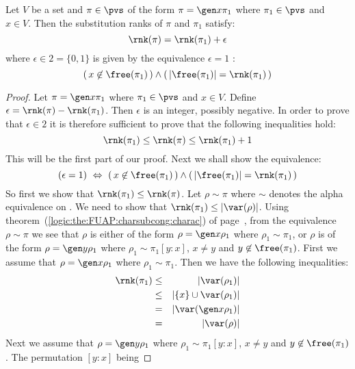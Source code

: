 \begin{prop}\label{logic:prop:FUAP:substrank:recursion:gen}
Let $V$ be a set and $\pi\in\pvs$ of the form $\pi=\gen x\pi_{1}$
where $\pi_{1}\in\pvs$ and $x\in V$. Then the substitution ranks of
$\pi$ and $\pi_{1}$ satisfy:
    \[
    \rnk(\pi)=\rnk(\pi_{1})+\epsilon
    \]
where $\epsilon\in 2=\{0,1\}$ is given by the equivalence
$\epsilon=1$ \ifand:
    \[
    (\,x\not\in\free(\pi_{1})\,)\land(\,|\free(\pi_{1})|
    =\rnk(\pi_{1})\,)
    \]
\end{prop}
\begin{proof}
Let $\pi=\gen x\pi_{1}$ where $\pi_{1}\in\pvs$ and $x\in V$. Define
$\epsilon = \rnk(\pi)-\rnk(\pi_{1})$. Then $\epsilon$ is an integer,
possibly negative. In order to prove that $\epsilon\in 2$ it is
therefore sufficient to prove that the following inequalities hold:
    \begin{equation}\label{logic:eqn:FUAP:substrank:recursion:gen:1}
    \rnk(\pi_{1})\leq\rnk(\pi)\leq\rnk(\pi_{1})+1
    \end{equation}
This will be the first part of our proof. Next we shall show the
equivalence:
    \begin{equation}\label{logic:eqn:FUAP:substrank:recursion:gen:2}
    (\epsilon =1)\ \Leftrightarrow\
    (\,x\not\in\free(\pi_{1})\,)\land(\,|\free(\pi_{1})|
    =\rnk(\pi_{1})\,)
    \end{equation}
So first we show that $\rnk(\pi_{1})\leq\rnk(\pi)$. Let
$\rho\sim\pi$ where $\sim$ denotes the alpha equivalence on
\pvs. We need to show that $\rnk(\pi_{1})\leq|\var(\rho)|$. Using
theorem~(\ref{logic:the:FUAP:charsubcong:charac}) of
page~\pageref{logic:the:FUAP:charsubcong:charac}, from the
equivalence $\rho\sim\pi$ we see that $\rho$ is either of the form
$\rho=\gen x\rho_{1}$ where $\rho_{1}\sim\pi_{1}$, or $\rho$ is of
the form $\rho=\gen y\rho_{1}$ where $\rho_{1}\sim\pi_{1}[y\!:\!x]$,
$x\neq y$ and $y\not\in\free(\pi_{1})$. First we assume that
$\rho=\gen x\rho_{1}$ where $\rho_{1}\sim\pi_{1}$. Then we have the
following inequalities:
    \begin{eqnarray*}
    \rnk(\pi_{1})&\leq&|\var(\rho_{1})|\\
    &\leq&|\{x\}\cup\var(\rho_{1})|\\
    &=&|\var(\gen x\rho_{1})|\\
    &=&|\var(\rho)|
    \end{eqnarray*}
Next we assume that $\rho=\gen y\rho_{1}$ where
$\rho_{1}\sim\pi_{1}[y\!:\!x]$, $x\neq y$ and
$y\not\in\free(\pi_{1})$. The permutation $[y\!:\!x]$ being

\end{proof}
